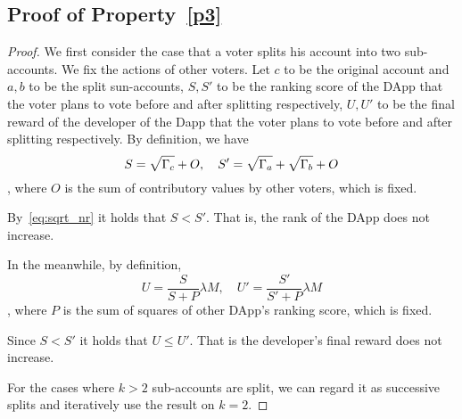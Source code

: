 \subsection{Proof of Property~\ref{p3}}
\begin{proof}
	We first consider the case that a voter splits his account into two sub-accounts. We fix the actions of other voters. Let $c$ to be the original account and $a,b$ to be the split sun-accounts, $S,S'$ to be the ranking score of the DApp that the voter plans to vote before and after splitting respectively, $U,U'$ to be the final reward of the developer of the Dapp that the voter plans to vote before and after splitting respectively. By definition, we have
	$$S= \sqrt{\Gamma_c}+O,\quad S'=\sqrt{\Gamma_a}+\sqrt{\Gamma_b}+O$$,
	where $O$ is the sum of contributory values by other voters, which is fixed.

	By~\ref{eq:sqrt_nr} it holds that $S < S'$. That is, the rank of the DApp does not increase.

	In the meanwhile, by definition,
	$$U = \frac{S}{S+P}\lambda M,\quad U' = \frac{S'}{S'+P} \lambda M$$,
	where $P$ is the sum of squares of other DApp's ranking score, which is fixed.

	Since $S < S'$ it holds that $U \leq U'$. That is the developer's final reward does not increase.

	For the cases where $k>2$ sub-accounts are split, we can regard it as successive splits and iteratively use the result on $k=2$.

\end{proof}
